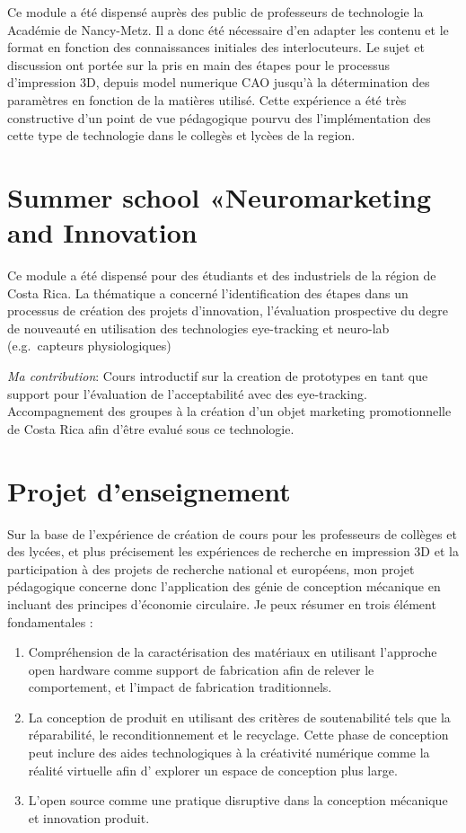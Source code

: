 \documentclass[
  12pt,
  oneside]{book}
\providecommand{\tightlist}{%
  \setlength{\itemsep}{0pt}\setlength{\parskip}{0pt}}
\begin{document}
Ce module a été dispensé auprès des public de professeurs de technologie la Académie de Nancy-Metz. Il a donc été nécessaire d'en adapter les contenu et le format en fonction des connaissances initiales des interlocuteurs. Le sujet et discussion ont portée sur la pris en main des étapes pour le processus d'impression 3D, depuis model numerique CAO jusqu'à la détermination des paramètres en fonction de la matières utilisé.
Cette expérience a été très constructive d'un point de vue pédagogique pourvu des l'implémentation des cette type de technologie dans le collegès et lycèes de la region.

\hypertarget{summer-school-neuromarketing-and-innovation}{%
\section{Summer school «Neuromarketing and Innovation}\label{summer-school-neuromarketing-and-innovation}}

Ce module a été dispensé pour des étudiants et des industriels de la région de Costa Rica.
La thématique a concerné l'identification des étapes dans un processus de création des projets d'innovation, l'évaluation prospective du degre de nouveauté en utilisation des technologies eye-tracking et neuro-lab (e.g.~capteurs physiologiques)

\emph{Ma contribution}: Cours introductif sur la creation de prototypes en tant que support pour l'évaluation de l'acceptabilité avec des eye-tracking. Accompagnement des groupes à la création d'un objet marketing promotionnelle de Costa Rica afin d'être evalué sous ce technologie.

\hypertarget{projet-denseignement}{%
\section{Projet d'enseignement}\label{projet-denseignement}}

Sur la base de l'expérience de création de cours pour les professeurs de collèges et des lycées, et plus précisement les expériences de recherche en impression 3D et la participation à des projets de recherche national et européens, mon projet pédagogique concerne donc l'application des génie de conception mécanique en incluant des principes d'économie circulaire. Je peux résumer en trois élément fondamentales :

\begin{enumerate}
\def\labelenumi{\arabic{enumi}.}
\tightlist
\item
  Compréhension de la caractérisation des matériaux en utilisant l'approche open hardware comme support de fabrication afin de relever le comportement, et l'impact de fabrication traditionnels.
\item
  La conception de produit en utilisant des critères de soutenabilité tels que la réparabilité, le reconditionnement et le recyclage. Cette phase de conception peut inclure des aides technologiques à la créativité numérique comme la réalité virtuelle afin d' explorer un espace de conception plus large.
\item
  L'open source comme une pratique disruptive dans la conception mécanique et innovation produit.
\end{enumerate}
\end{document}

